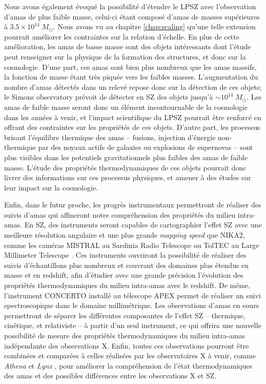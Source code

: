 Nous avons également évoqué la possibilité d'étendre le LPSZ avec l'observation d'amas de plus faible masse, celui-ci étant composé d'amas de masses supérieures à $3.5 \times 10^{14} \; M_\odot$.
Nous avons vu au chapitre \ref{chap:scaling} qu'une telle extension pourrait améliorer les contraintes sur la relation d'échelle.
En plus de cette amélioration, les amas de basse masse sont des objets intéressants dont l'étude peut renseigner sur la physique de la formation des structures, et donc sur la cosmologie.
D'une part, ces amas sont bien plus nombreux que les amas massifs, la fonction de masse étant très piquée vers les faibles masses.
L'augmentation du nombre d'amas détectés dans un relevé repose donc sur la détection de ces objets; le Simons observatory prévoit de détecter en SZ des objets jusqu'à $\sim 10^{14} \; M_\odot$.
Les amas de faible masse seront donc un élément incontournable de la cosmologie dans les années à venir, et l'impact scientifique du LPSZ pourrait être renforcé en offrant des contraintes sur les propriétés de ces objets.
D'autre part, les processus brisant l'équilibre thermique des amas -- fusions, injection d'énergie non-thermique par des noyaux actifs de galaxies ou explosions de supernovas -- sont plus visibles dans les potentiels gravitationnels plus faibles des amas de faible masse.
L'étude des propriétés thermodynamiques de ces objets pourrait donc livrer des informations sur ces processus physiques, et amener à des études sur leur impact sur la cosmologie.

Enfin, dans le futur proche, les progrès instrumentaux permettront de réaliser des suivis d'amas qui affineront notre compréhension des propriétés du milieu intra-amas.
En SZ, des instruments seront capables de cartographier l'effet SZ avec une meilleure résolution angulaire et une plus grande \textit{mapping speed} que NIKA2, comme les caméras MISTRAL au Sardinia Radio Telescope \cite{bolli_sardinia_2015} ou TolTEC au Large Millimeter Telescope \cite{wilson_toltec_2020}.
Ces instruments ouvriront la possibilité de réaliser des suivis d'échantillons plus nombreux et couvrant des domaines plus étendus en masse et en redshift, afin d'étudier avec une grande précision l'évolution des propriétés thermodynamiques du milieu intra-amas avec le redshift.
De même, l'instrument CONCERTO \cite{the_concerto_collaboration_wide_2020} installé au télescope APEX permet de réaliser un suivi spectroscopique dans le domaine millimétrique.
Les observations d'amas en cours permettront de séparer les différentes composantes de l'effet SZ -- thermique, cinétique, et relativiste -- à partir d'un seul instrument, ce qui offrira une nouvelle possibilité de mesure des propriétés thermodynamiques du milieu intra-amas indépendante des observations X.
Enfin, toutes ces observations pourront être combinées et comparées à celles réalisées par les observatoires X à venir, comme \textit{Athena} \cite{nandra_hot_2013, barret_athena_2020} et \textit{Lynx} \cite{the_lynx_team_lynx_2018}, pour améliorer la compréhension de l'état thermodynamiques des amas et des possibles différences entre les observations X et SZ.


